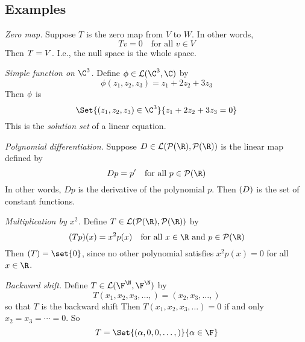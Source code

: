 \subsection*{Examples}

\textit{Zero map.}
Suppose $T$ is the zero map from $V$ to $W$.
In other words,
\[
Tv = 0 \quad \text{for all } v \in V
\]
Then $\null T = V$.
I.e., the null space is the whole space.

\textit{Simple function on $\C ^3$.}
Define $\phi  \in \mathcal{L} (\C ^3, \C )$ by
\[
\phi (z_1, z_2, z_3) = z_1 + 2z_2 + 3z_3
\]
Then $\null \phi $ is
\[
\Set{(z_1,z_2,z_3) \in \C ^3}{z_1 + 2z_2 + 3z_3 = 0}
\]
This is the \textit{solution set} of a linear equation.

\textit{Polynomial differentiation.}
Suppose $D \in \mathcal{L} (\mathcal{P} (\R ), \mathcal{P} (\R ))$ is the linear map defined by
\[
Dp = p' \quad \text{for all } p \in \mathcal{P} (\R )
\]
In other words, $Dp$ is the derivative of the polynomial $p$.
Then $\null(D)$ is the set of constant functions.

\textit{Multiplication by $x^2$.}
Define $T \in \mathcal{L} (\mathcal{P} (\R ), \mathcal{P} (\R ))$ by
\[
(Tp)(x) = x^2p(x) \quad \text{for all } x \in \R  \text{ and } p \in \mathcal{P} (\R )
\]
Then $\null(T) = \set{0}$, since no other polynomial satisfies $x^2p(x) = 0$ for all $x \in \R $.

\textit{Backward shift.}
Define $T \in \mathcal{L} (\F ^\N  , \F ^\N  )$ by
\[
T(x_1, x_2, x_3, \dots , ) = (x_2, x_3, \dots , )
\]
so that $T$ is the backward shift
Then $T(x_1, x_2, x_3, \dots ) = 0$ if and only $x_2 = x_3 = \cdots = 0$.
So
\[
\null T = \Set{(\alpha , 0, 0, \dots ,)}{\alpha  \in \F }
\]

\blankpage